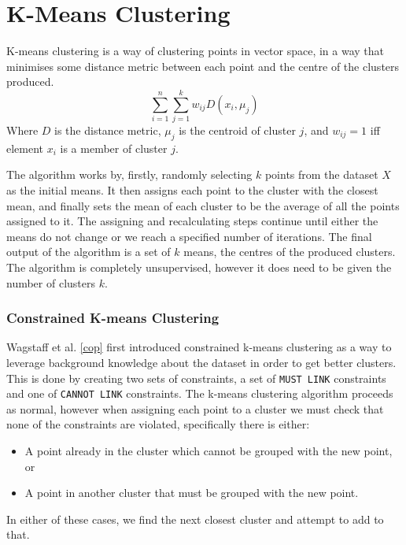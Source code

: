\documentclass[12pt,a4paper,twoside,openright]{report}
\begin{document}

\section{K-Means Clustering}
K-means clustering is a way of clustering points in vector space, in a way that minimises some distance metric between each point and the centre of the clusters produced. 
\begin{equation}
    \sum_{i=1}^{n}\sum_{j=1}^{k}w_{ij}D(x_i, \mu_j)
\end{equation}
Where $D$ is the distance metric, $\mu_j$ is the centroid of cluster $j$, and $w_{ij} = 1$ iff element $x_i$ is a member of cluster $j$.
\newline

The algorithm works by, firstly, randomly selecting $k$ points from the dataset $X$ as the initial means. It then assigns each point to the cluster with the closest mean, and finally sets the mean of each cluster to be the average of all the points assigned to it. The assigning and recalculating steps continue until either the means do not change or we reach a specified number of iterations. The final output of the algorithm is a set of $k$ means, the centres of the produced clusters. The algorithm is completely unsupervised, however it does need to be given the number of clusters $k$. 

\subsubsection{Constrained K-means Clustering} \label{section:ckmeans}
Wagstaff et al. \ref{cop} first introduced constrained k-means clustering as a way to leverage background knowledge about the dataset in order to get better clusters. This is done by creating two sets of constraints, a set of \texttt{MUST LINK} constraints and one of \texttt{CANNOT LINK} constraints. The k-means clustering algorithm proceeds as normal, however when assigning each point to a cluster we must check that none of the constraints are violated, specifically there is either:
\begin{itemize}
    \item A point already in the cluster which cannot be grouped with the new point, or
    \item A point in another cluster that must be grouped with the new point.
\end{itemize}
In either of these cases, we find the next closest cluster and attempt to add to that. 
\end{document}
